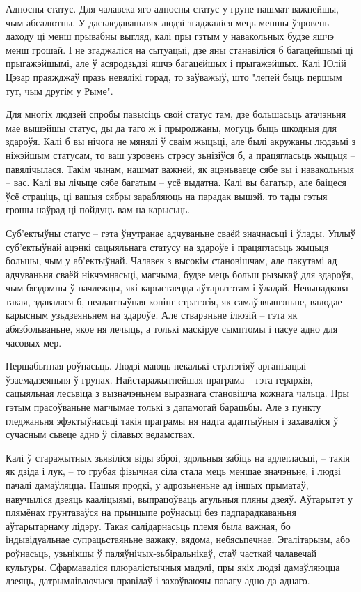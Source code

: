 Адносны статус. Для чалавека яго адносны статус у групе нашмат важнейшы, чым абсалютны. У дасьледаваньнях людзі згаджаліся мець меншы ўзровень даходу ці менш прывабны выгляд, калі пры гэтым у навакольных будзе яшчэ менш грошай. І не згаджаліся на сытуацыі, дзе яны станавіліся б багацейшымі ці прыгажэйшымі, але ў асяродзьдзі яшчэ багацейшых і прыгажэйшых. Калі Юлій Цэзар праяжджаў празь невялікі горад, то заўважыў, што "лепей быць першым тут, чым другім у Рыме".

Для многіх людзей спробы павысіць свой статус там, дзе большасьць атачэньня мае вышэйшы статус, ды да таго ж і прыроджаны, могуць быць шкодныя для здароўя. Калі б вы нічога не мянялі ў сваім жыцьці, але былі акружаны людзьмі з ніжэйшым статусам, то ваш узровень стрэсу зьнізіўся б, а працягласьць жыцьця – павялічылася. Такім чынам, нашмат важней, як ацэньваеце сябе вы і навакольныя – вас. Калі вы лічыце сябе багатым – усё выдатна. Калі вы багатыр, але баіцеся ўсё страціць, ці вашыя сябры зарабляюць на парадак вышэй, то тады гэтыя грошы наўрад ці пойдуць вам на карысьць.

Суб'ектыўны статус – гэта ўнутранае адчуваньне сваёй значнасьці і ўлады. Уплыў суб'ектыўнай ацэнкі сацыяльнага статусу на здароўе і працягласьць жыцьця большы, чым у аб'ектыўнай. Чалавек з высокім становішчам, але пакутамі ад адчуваньня сваёй нікчэмнасьці, магчыма, будзе мець больш рызыкаў для здароўя, чым бяздомны ў начлежцы, які карыстаецца аўтарытэтам і ўладай. Невыпадкова такая, здавалася б, неадаптыўная копінг-стратэгія, як самаўзвышэньне, валодае карысным узьдзеяньнем на здароўе. Але стварэньне ілюзій – гэта як абязбольваньне, якое ня лечыць, а толькі маскіруе сымптомы і пасуе адно для часовых мер.

Першабытная роўнасьць. Людзі маюць некалькі стратэгіяў арганізацыі ўзаемадзеяньня ў групах. Найстаражытнейшая праграма – гэта герархія, сацыяльная лесьвіца з вызначэньнем выразнага становішча кожнага чальца. Пры гэтым прасоўваньне магчымае толькі з дапамогай барацьбы. Але з пункту гледжаньня эфэктыўнасьці такія праграмы ня надта адаптыўныя і захаваліся ў сучасным сьвеце адно ў сілавых ведамствах.

Калі ў старажытных зьявіліся віды зброі, здольныя забіць на адлегласьці, – такія як дзіда і лук, – то грубая фізычная сіла стала мець меншае значэньне, і людзі пачалі дамаўляцца. Нашыя продкі, у адрозьненьне ад іншых прыматаў, навучыліся дзеяць кааліцыямі, выпрацоўваць агульныя пляны дзеяў. Аўтарытэт у плямёнах грунтаваўся на прынцыпе роўнасьці без падпарадкаваньня аўтарытарнаму лідэру. Такая салідарнасьць племя была важная, бо індывідуальнае супрацьстаяньне важаку, вядома, небясьпечнае. Эгалітарызм, або роўнасьць, узьнікшы ў паляўнічых-зьбіральнікаў, стаў часткай чалавечай культуры. Сфармаваліся плюралістычныя мадэлі, пры якіх людзі дамаўляюцца дзеяць, датрымліваючыся правілаў і захоўваючы павагу адно да аднаго.

